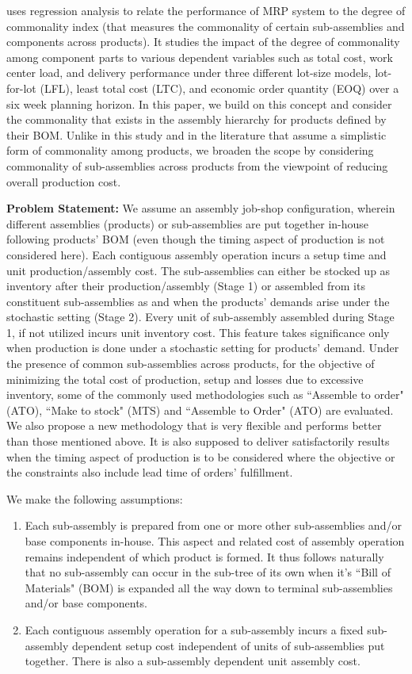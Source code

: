 \documentclass[twoside,onecolumn,12pt,letterpaper]{article}
\begin{document}
\citet{collier1981measurement} uses regression analysis to relate the performance of MRP system to the degree of commonality index (that measures the commonality of certain sub-assemblies and components across products). It studies the impact of the degree of commonality among component parts to various dependent variables such as total cost, work center load, and delivery performance under three different lot-size models, lot-for-lot (LFL), least total cost (LTC), and economic order quantity (EOQ) over a six week planning horizon. In this paper, we build on this concept and consider the commonality that exists in the assembly hierarchy for products defined by their BOM. Unlike in this study and in the literature that assume a simplistic  form of commonality among products, we broaden the scope by considering commonality of sub-assemblies across products from the viewpoint of reducing overall production cost. 

\textbf{Problem Statement:} We assume an assembly job-shop configuration, wherein different assemblies (products) or sub-assemblies are put together in-house following products' BOM (even though the timing aspect of production is not considered here). Each contiguous assembly operation incurs a setup time and unit production/assembly cost. The sub-assemblies can either be stocked up as inventory after their production/assembly (Stage 1) or assembled from its constituent sub-assemblies as and when the products' demands arise under the stochastic setting (Stage 2). Every unit of sub-assembly assembled during Stage 1, if not utilized incurs unit inventory cost. This feature takes significance only when production is done under a stochastic setting for products' demand. Under the presence of common sub-assemblies across products, for the objective of minimizing the total cost of production, setup and losses due to excessive inventory, some of the commonly used methodologies such as ``Assemble to order" (ATO), ``Make to stock" (MTS) and ``Assemble to Order" (ATO) are evaluated. We also propose a new methodology that is very flexible and performs better than those mentioned above. It is also supposed to deliver satisfactorily results when the timing aspect of production is to be considered where the objective or the constraints also include lead time of orders' fulfillment. 

We make the following assumptions:
\begin{enumerate} [noitemsep, topsep=6pt]
\item Each sub-assembly is prepared from one or more other sub-assemblies and/or base components in-house. This aspect and related cost of assembly operation remains independent of which product is formed. It thus follows naturally that no sub-assembly can occur in the sub-tree of its own when it's ``Bill of Materials" (BOM) is expanded all the way down to terminal sub-assemblies and/or base components.
\item Each contiguous assembly operation for a sub-assembly incurs a fixed sub-assembly dependent setup cost independent of units of sub-assemblies put together. There is also a sub-assembly dependent unit assembly cost. 
\end{enumerate}
\end{document}

